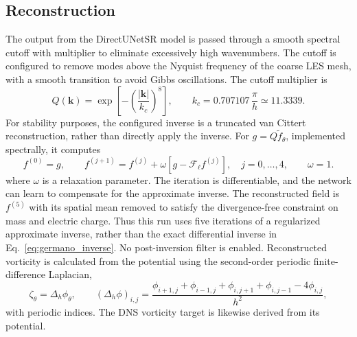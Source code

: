 \documentclass[authoryear,preprint,review,12pt]{elsarticle}
\begin{document}
\subsection{Reconstruction}
The output from the DirectUNetSR model is passed through a smooth spectral cutoff with multiplier to eliminate excessively high wavenumbers. The cutoff is configured to remove modes above the Nyquist frequency of the coarse LES mesh, with a smooth transition to avoid Gibbs oscillations. The cutoff multiplier is
\begin{equation}
    Q(\mathbf{k})=\exp\left[-\left(\frac{|\mathbf{k}|}{k_c}\right)^8\right],
    \qquad k_c=0.707107\,\frac{\pi}{h}\simeq11.3339.
\end{equation}
For stability purposes, the configured inverse is a truncated van Cittert reconstruction, rather than directly apply the inverse. For $g=Q\widetilde f_\theta$, implemented spectrally, it computes
\begin{equation}
    f^{(0)}=g,\qquad
    f^{(j+1)}=f^{(j)}+\omega\left[g-\mathcal{F}_\ell f^{(j)}\right],
    \quad j=0,\ldots,4,\qquad\omega=1.
    \label{eq:training_van_cittert}
\end{equation}
where $\omega$ is a relaxation parameter. The iteration is differentiable, and the network can learn to compensate for the approximate inverse. The reconstructed field is $f^{(5)}$ with its spatial mean removed to satisfy the divergence-free constraint on mass and electric charge. Thus this run uses five iterations of a regularized approximate inverse, rather than the exact differential inverse in Eq.~\eqref{eq:germano_inverse}. No post-inversion filter is enabled. Reconstructed vorticity is calculated from the potential using the second-order periodic finite-difference Laplacian,
\begin{equation}
    \zeta_\theta=\Delta_h\phi_\theta,\qquad
    (\Delta_h\phi)_{i,j}
    =\frac{\phi_{i+1,j}+\phi_{i-1,j}+\phi_{i,j+1}+\phi_{i,j-1}-4\phi_{i,j}}{h^2},
\end{equation}
with periodic indices. The DNS vorticity target is likewise derived from its potential.
\end{document}
